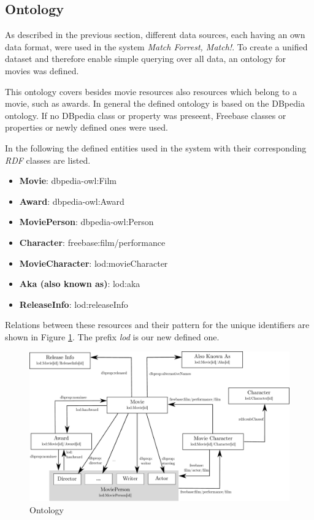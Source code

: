 \subsection{Ontology}
\label{subsec_method_ontology}

As described in the previous section, different data sources, each having an own data format, were used in the system \emph{Match Forrest, Match!}.
To create a unified dataset and therefore enable simple querying over all data, an ontology for movies was defined.

This ontology covers besides movie resources also resources which belong to a movie, such as awards.
In general the defined ontology is based on the DBpedia ontology.
If no DBpedia class or property was preseent, Freebase classes or properties or newly defined ones were used.

In the following the defined entities used in the system with their corresponding \textit{RDF} classes are listed.
\begin{itemize}
	\item \textbf{Movie}: dbpedia-owl:Film
	\item \textbf{Award}: dbpedia-owl:Award
	\item \textbf{MoviePerson}: dbpedia-owl:Person
	\item \textbf{Character}: freebase:film/performance
	\item \textbf{MovieCharacter}: lod:movieCharacter
	\item \textbf{Aka (also known as)}: lod:aka
	\item \textbf{ReleaseInfo}: lod:releaseInfo
\end{itemize}
Relations between these resources and their pattern for the unique identifiers are shown in Figure \ref{fig_ontology}.
The prefix \textit{lod} is our new defined one.

\begin{figure}[h!]
\includegraphics[width=\textwidth]{images/ontology.pdf}
\caption{Ontology}
\label{fig_ontology}
\end{figure}

